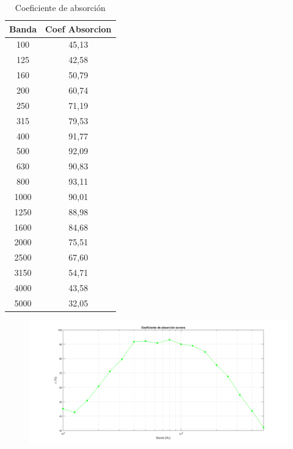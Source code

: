 \begin{table}[]
    \centering
    \begin{tabular}{|c|c|} \hline
        \textbf{Banda} & Coef Absorcion \\ \hline \hline
        100 & 45,13\\ \hline
        125	& 42,58\\ \hline
        160	& 50,79\\ \hline
        200	& 60,74\\ \hline
        250	& 71,19\\ \hline
        315	& 79,53\\ \hline
        400	& 91,77\\ \hline
        500	& 92,09\\ \hline
        630	& 90,83\\ \hline
        800	& 93,11\\ \hline
        1000&	90,01\\ \hline
        1250&	88,98\\ \hline
        1600&	84,68\\ \hline
        2000&	75,51\\ \hline
        2500&	67,60\\ \hline
        3150&	54,71\\ \hline
        4000&	43,58\\ \hline
        5000&	32,05\\ \hline
    \end{tabular}
    \caption{Coeficiente de absorción}
    \label{tab:coef_absorcion_sonora}
\end{table}


\begin{figure}[H]
	\centering
	\includegraphics[scale=0.47]{./img/Coef_absorcion_sonora.png}
	\caption{}
	\label{fig::coef_absorcion_sonora}
\end{figure}

